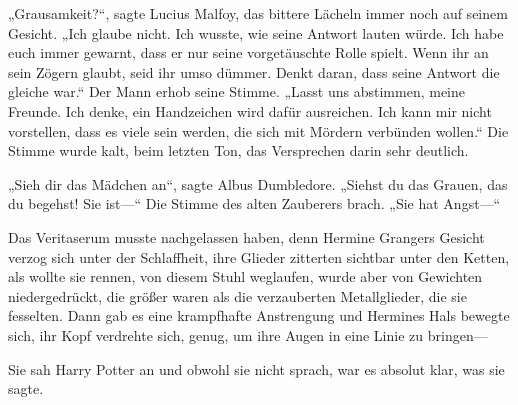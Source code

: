 „Grausamkeit?“, sagte Lucius Malfoy, das bittere Lächeln immer noch auf seinem Gesicht. „Ich glaube nicht. Ich wusste, wie seine Antwort lauten würde. Ich habe euch immer gewarnt, dass er nur seine vorgetäuschte Rolle spielt. Wenn ihr an sein Zögern glaubt, seid ihr umso dümmer. Denkt daran, dass seine Antwort die gleiche war.“
Der Mann erhob seine Stimme.
„Lasst uns abstimmen, meine Freunde. Ich denke, ein Handzeichen wird dafür ausreichen. Ich kann mir nicht vorstellen, dass es viele sein werden, die sich mit Mördern verbünden wollen.“
Die Stimme wurde kalt, beim letzten Ton, das Versprechen darin sehr deutlich.

„Sieh dir das Mädchen an“, sagte Albus Dumbledore. „Siehst du das Grauen, das du begehst! Sie ist—“ Die Stimme des alten Zauberers brach. „Sie hat Angst—“

Das Veritaserum musste nachgelassen haben, denn Hermine Grangers Gesicht verzog sich unter der Schlaffheit, ihre Glieder zitterten sichtbar unter den Ketten, als wollte sie rennen, von diesem Stuhl weglaufen, wurde aber von Gewichten niedergedrückt, die größer waren als die verzauberten Metallglieder, die sie fesselten. Dann gab es eine krampfhafte Anstrengung und Hermines Hals bewegte sich, ihr Kopf verdrehte sich, genug, um ihre Augen in eine Linie zu bringen—

Sie sah Harry Potter an und obwohl sie nicht sprach, war es absolut klar, was sie sagte.

